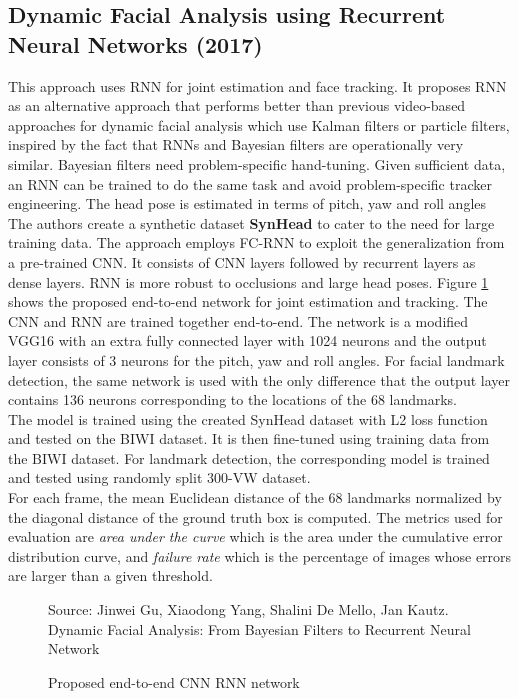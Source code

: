 \documentclass{llncs}
\begin{document}
\subsection{Dynamic Facial Analysis using Recurrent Neural Networks (2017) \cite{dynamic_facial_analysis}}

This approach uses RNN for joint estimation and face tracking. 
It proposes RNN as an alternative approach that performs better than previous video-based approaches for dynamic facial analysis which use Kalman filters or particle filters, inspired by the fact that RNNs and Bayesian filters are operationally very similar.
Bayesian filters need problem-specific hand-tuning. Given sufficient data, an RNN can be trained to do the same task and avoid problem-specific tracker engineering. The head pose is estimated in terms of pitch, yaw and roll angles
The authors create a synthetic dataset \textbf{SynHead} to cater to the need for large training data. The approach employs FC-RNN to exploit the generalization from a pre-trained CNN. It consists of CNN layers followed by recurrent layers as dense layers. RNN is more robust to occlusions and large head poses. Figure \ref{cnn_rnn} shows the proposed end-to-end network for joint estimation and tracking. The CNN and RNN are trained together end-to-end. The network is a modified VGG16 with an extra fully connected layer with 1024 neurons and the output layer consists of 3 neurons for the pitch, yaw and roll angles. For facial landmark detection, the same network is used with the only difference that the output layer contains 136 neurons corresponding to the locations of the 68 landmarks.\\

The model is trained using the created SynHead dataset with L2 loss function and tested on the BIWI dataset. It is then fine-tuned using training data from the BIWI dataset. For landmark detection, the corresponding model is trained and tested using randomly split 300-VW dataset. \\

For each frame, the mean Euclidean distance of the 68 landmarks normalized by the diagonal distance of the ground truth box is computed. The metrics used for evaluation are \textit{area under the curve} which is the area under the cumulative error distribution curve, and \textit{failure rate} which is the percentage of images whose errors are larger than a given threshold.

\begin{figure}
%
{Source: Jinwei Gu, Xiaodong Yang, Shalini De Mello, Jan Kautz. Dynamic Facial Analysis: From Bayesian Filters to Recurrent Neural Network}
\caption{Proposed end-to-end CNN RNN network}
\label{cnn_rnn}
\end{figure}
\end{document}
